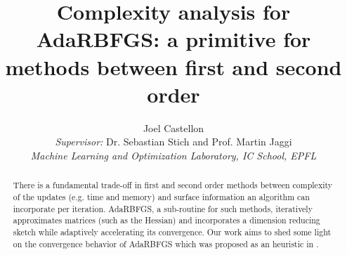 \documentclass[12pt,conference,compsocconf]{IEEEtran}
\begin{document}
\renewcommand{\arraystretch}{1.2}

\title{Complexity analysis for AdaRBFGS: a primitive for methods between first and second order}

\author{
  Joel Castellon\\
  \textit{Supervisor:} Dr. Sebastian Stich and Prof. Martin Jaggi\\
  \vspace{4mm}
  \textit{Machine Learning and Optimization Laboratory, IC School, EPFL}\\
}


\maketitle
\begin{abstract}
There is a fundamental trade-off in first and second order methods between complexity of the updates (e.g. time and memory) and surface information an algorithm can incorporate per iteration. AdaRBFGS, a sub-routine for such methods, iteratively approximates matrices (such as the Hessian) and incorporates a dimension reducing sketch while adaptively accelerating its convergence. Our work aims to shed some light on the convergence behavior of AdaRBFGS which was proposed as an heuristic in \cite{Gower1}.
\end{abstract}
\end{document}
